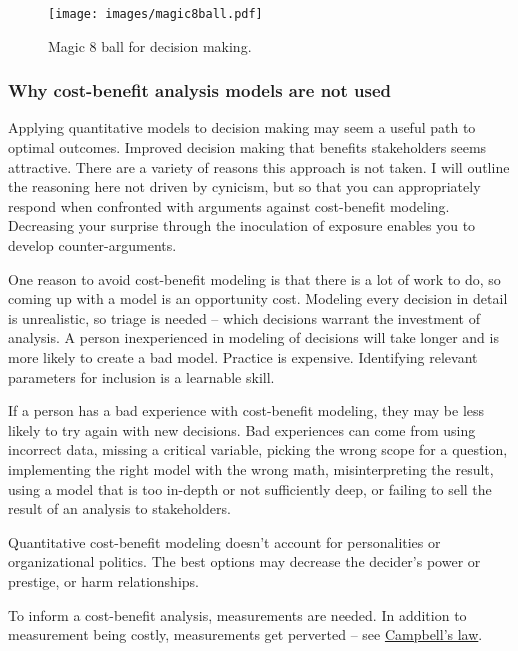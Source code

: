 \begin{figure}
    \centering
    \texttt{[image: images/magic8ball.pdf]}
    \caption{Magic 8 ball for decision making.}
    \label{fig:magic8ball}
\end{figure}

\subsubsection{Why cost-benefit analysis models are not used}

Applying quantitative models to decision making may seem a useful path to optimal outcomes. Improved decision making that benefits stakeholders seems attractive. There are a variety of reasons this approach is not taken. I will outline the reasoning here not driven by cynicism, but so that you can appropriately respond when confronted with arguments against cost-benefit modeling. Decreasing your surprise through the inoculation of exposure enables you to develop counter-arguments. 

One reason to avoid cost-benefit modeling is that there is a lot of work to do, so coming up with a model is an opportunity cost. Modeling every decision in detail is unrealistic, so triage is needed -- which decisions warrant the investment of analysis. A person inexperienced in modeling of decisions will take longer and is more likely to create a bad model. Practice is expensive. Identifying relevant parameters for inclusion is a learnable skill. 

If a person has a bad experience with cost-benefit modeling, they may be less likely to try again with new decisions. Bad experiences can come from using incorrect data, missing a critical variable, picking the wrong scope for a question, implementing the right model with the wrong math, misinterpreting the result, using a model that is too in-depth or not sufficiently deep, or failing to sell the result of an analysis to stakeholders.

Quantitative cost-benefit modeling doesn't account for personalities or organizational politics. The best options may decrease the decider's power or prestige, or harm relationships. 

To inform a cost-benefit analysis, measurements are needed. In addition to measurement being costly, measurements get perverted -- see \href{https://en.wikipedia.org/wiki/Campbell\%27s_law}{Campbell's law}. 

